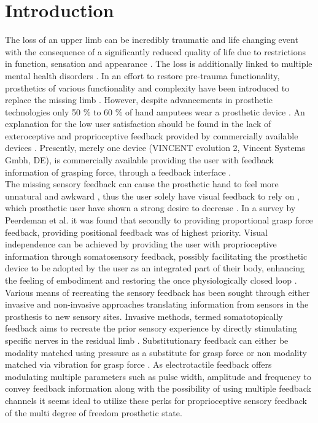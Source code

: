 \chapter{Introduction}

The loss of an upper limb can be incredibly traumatic and life changing event with the consequence of a significantly reduced quality of life due to restrictions in function, sensation and appearance \cite{Schofield2014,Ostlie2011}. The loss is additionally linked to multiple mental health disorders \cite{Ostlie2011}.
In an effort to restore pre-trauma functionality, prosthetics of various functionality and complexity have been introduced to replace the missing limb \cite{Geethanjali2016}. However, despite advancements in prosthetic technologies only 50 $\percent$ to 60 $\percent$ of hand amputees wear a prosthetic device \cite{Stephens-Fripp2018}. An explanation for the low user satisfaction should be found in the lack of exteroceptive and proprioceptive feedback provided by commercially available devices \cite{Peerdeman2011}. Presently, merely one device (VINCENT evolution 2, Vincent Systems Gmbh, DE), is commercially available providing the user with feedback information of grasping force, through a feedback interface \cite{Systems2005}. \\    
The missing sensory feedback can cause the prosthetic hand to feel more unnatural and awkward \cite{Pamungkas2015}, thus the user solely have visual feedback to rely on \cite{Stephens-Fripp2018,Pamungkas2015}, which prosthetic user have shown a strong desire to decrease \cite{Atkins1996}. In a survey by Peerdeman et al. \cite{Peerdeman2011} it was found that secondly to providing proportional grasp force feedback, providing positional feedback was of highest priority. Visual independence can be achieved by providing the user with proprioceptive information through somatosensory feedback, possibly facilitating the prosthetic device to be adopted by the user as an integrated part of their body, enhancing the feeling of embodiment and restoring the once physiologically closed loop \cite{Stephens-Fripp2018,Xu2016,Strbac2016,Geng2012}. \\
Various means of recreating the sensory feedback has been sought through either invasive and non-invasive approaches translating information from sensors in the prosthesis to new sensory sites. Invasive methods, termed somatotopically feedback aims to recreate the prior sensory experience by directly stimulating specific nerves in the residual limb \cite{Schofield2014,Stephens-Fripp2018}.
Substitutionary feedback can either be modality matched using pressure as a substitute for grasp force \cite{Godfrey2017} or non modality matched via vibration for grasp force \cite{Ninu2014,Nabeel2016}.
As electrotactile feedback offers modulating multiple parameters such as pulse width, amplitude and frequency to convey feedback information along with the possibility of using multiple feedback channels it seems ideal to utilize these perks for proprioceptive sensory feedback of the multi degree of freedom prosthetic state.  

